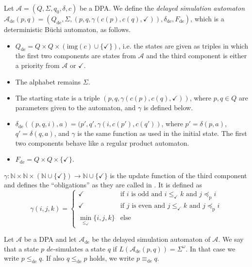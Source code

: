 \begin{defn}
	Let $\mathcal{A} = (Q, \Sigma, q_0, \delta, c)$ be a DPA. We define the \emph{delayed simulation automaton} $\mathcal{A}_\text{de}(p, q) = (Q_\text{de}, \Sigma, (p, q, \gamma(c(p), c(q), \checkmark)), \delta_\text{de}, F_\text{de})$, which is a deterministic Büchi automaton, as follows.
	
	\begin{itemize}
		\item $Q_\text{de} = Q \times Q \times (\text{img}(c) \cup \{ \checkmark \})$, i.e. the states are given as triples in which the first two components are states from $\mathcal{A}$ and the third component is either a priority from $\mathcal{A}$ or $\checkmark$.
		\item The alphabet remains $\Sigma$.
		\item The starting state is a triple $(p, q, \gamma(c(p), c(q), \checkmark))$, where $p, q \in Q$ are parameters given to the automaton, and $\gamma$ is defined below.
		\item $\delta_\text{de}( (p, q, i), a ) = ( p', q', \gamma(i, c(p'), c(q'))$, where $p' = \delta(p, a)$, $q' = \delta(q, a)$, and $\gamma$ is the same function as used in the initial state. The first two components behave like a regular product automaton.
		\item $F_\text{de} = Q \times Q \times \{ \checkmark \}$.
	\end{itemize}
	
	$\gamma : \mathbb{N} \times \mathbb{N} \times (\mathbb{N} \cup \{\checkmark\}) \rightarrow \mathbb{N} \cup \{\checkmark\}$ is the update function of the third component and defines the \enquote{obligations} as they are called in \cite{}. It is defined as 
	$$ \gamma(i, j, k) = \begin{cases}
		\checkmark & \text{if } i \text{ is odd and } i \leq_\checkmark k \text{ and } j \preceq_\text{p} i \\
		\checkmark & \text{if } j \text{ is even and } j \leq_\checkmark k \text{ and } j \preceq_\text{p} i \\
		\min_{\leq_\checkmark} \{ i,j,k \} & \text{else}
	\end{cases} $$
\end{defn}


\begin{defn}
	Let $\mathcal{A}$ be a DPA and let $\mathcal{A}_\text{de}$ be the delayed simulation automaton of $\mathcal{A}$. We say that a state $p$ $de$-simulates a state $q$ if $L(\mathcal{A}_\text{de}(p, q)) = \Sigma^\omega$. In that case we write $p \leq_\text{de} q$. If also $q \leq_\text{de} p$ holds, we write $p \equiv_\text{de} q$.
\end{defn}



